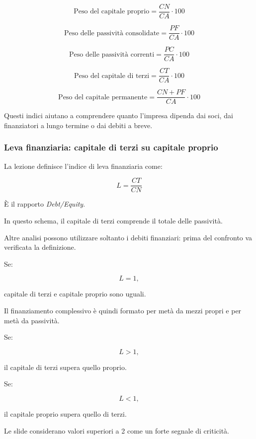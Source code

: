 \[
\boxed{
\text{Peso del capitale proprio}
=
\frac{CN}{CA}\cdot100
}
\]

\[
\boxed{
\text{Peso delle passività consolidate}
=
\frac{PF}{CA}\cdot100
}
\]

\[
\boxed{
\text{Peso delle passività correnti}
=
\frac{PC}{CA}\cdot100
}
\]

\[
\boxed{
\text{Peso del capitale di terzi}
=
\frac{CT}{CA}\cdot100
}
\]

\[
\boxed{
\text{Peso del capitale permanente}
=
\frac{CN+PF}{CA}\cdot100
}
\]

\noindent Questi indici aiutano
a comprendere quanto l'impresa
dipenda dai soci,
dai finanziatori a lungo termine
o dai debiti a breve.


\subsubsection*{Leva finanziaria:
capitale di terzi su capitale proprio}

\noindent La lezione definisce
l'indice di leva finanziaria come:

\[
\boxed{
L=\frac{CT}{CN}
}
\]

\noindent È il rapporto
\textit{Debt/Equity}.

\noindent In questo schema,
il capitale di terzi
comprende il totale delle passività.

\noindent Altre analisi possono utilizzare
soltanto i debiti finanziari:
prima del confronto
va verificata la definizione.

\medskip

\noindent Se:

\[
L=1,
\]

\noindent capitale di terzi
e capitale proprio sono uguali.

\noindent Il finanziamento complessivo
è quindi formato per metà
da mezzi propri
e per metà da passività.

\medskip

\noindent Se:

\[
L>1,
\]

\noindent il capitale di terzi
supera quello proprio.

\noindent Se:

\[
L<1,
\]

\noindent il capitale proprio
supera quello di terzi.

\medskip

\noindent Le slide considerano
valori superiori a 2
come un forte segnale di criticità.

